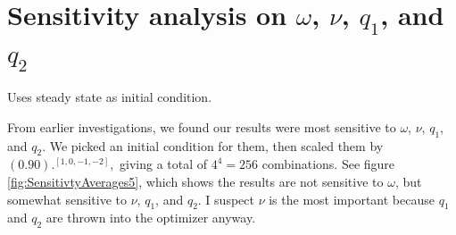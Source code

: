 \documentclass{article}
\begin{document}
\section{Sensitivity analysis on $\omega$, $\nu$, $q_1$, and $q_2$}

Uses steady state as initial condition.

From earlier investigations, we found our results were most sensitive to $\omega$, $\nu$, $q_1$, and $q_2$.  We picked an initial condition for them, then scaled them by $(0.90).^{[1,0,-1,-2]},$ giving a total of $ 4^4 = 256$ combinations.  See figure \ref{fig:SensitivtyAverages5}, which shows the results are not sensitive to $\omega$, but somewhat sensitive to $\nu$, $q_1$, and $q_2$.  I suspect $\nu$ is the most important because $q_1$ and $q_2$ are thrown into the optimizer anyway.
\end{document}

